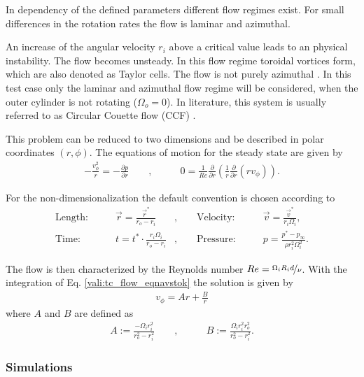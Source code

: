 In dependency of the defined parameters different flow regimes exist.
For small differences in the rotation rates the flow is laminar and azimuthal.

An increase of the angular velocity $r_i$ above a critical value leads to an physical instability. The flow becomes unsteady.
In this flow regime toroidal vortices form, which are also denoted as Taylor cells.
The flow is not purely azimuthal \citep{tritton88}.
In this test case only the laminar and azimuthal flow regime will be considered, when the outer cylinder is not rotating ($\Omega_o = 0$).
In literature, this system is usually referred to as Circular Couette flow (CCF) \citep{Kundu2012}.

This problem can be reduced to two dimensions and be described in polar coordinates $(r, \phi)$. The equations of motion for the steady state are given by \citep{Kundu2012}
\begin{align}
    \label{vali:tc_flow_eqnavstok}
    -\frac{v^2_\phi}{r} = - \frac{\partial p}{\partial r} \qquad ,& \qquad 0 = \frac{1}{Re}\frac{\partial}{\partial r}\left(\frac{1}{r}\frac{\partial}{\partial r}(r v_\phi)\right).
\end{align}


For the non-dimensionalization the default convention is chosen according to  \citep{Chen2015}
\begin{align}
    \text{Length:}\qquad &  \vec{r} = \frac{\vec{r}^*}{r_o - r_i}  &,
    \qquad \text{Velocity:}\qquad& \vec{v} =  \frac{\vec{v}^*}{r_i\Omega_i},\\
    \text{Time:}  \qquad & t = t^* \cdot \frac{r_i \Omega_i}{r_o - r_i}&,
    \qquad  \text{Pressure:}\qquad & p = \frac{p^* - p_\infty}{\rho r_i^2\Omega_i^2}.
\end{align}


The flow is then characterized by the Reynolds number $Re = \nicefrac{\Omega_i R_i d}{\nu}$.
With the integration of Eq. \ref{vali:tc_flow_eqnavstok} the solution is given by \citep{Kundu2012}
\begin{align}
    v_\phi = Ar + \frac{B}{r}
\end{align}
where $A$ and $B$ are defined as
\begin{align}
    A := \frac{-\Omega_i r_i^2}{r^2_o - r^2_i} \qquad ,& \qquad B := \frac{\Omega_i r^2_i r^2_o}{r^2_o - r^2_i}.
\end{align}

\subsubsection{Simulations}

